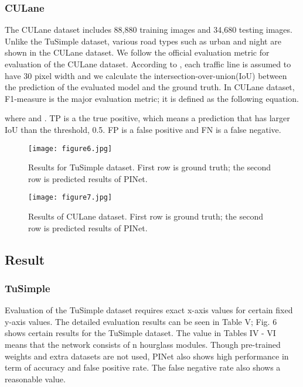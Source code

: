 \documentclass[journal]{IEEEtran}
\begin{document}
\subsubsection{CULane}
The CULane dataset includes 88,880 training images and 34,680 testing images. Unlike the TuSimple dataset, various road types such as urban and night are shown in the CULane dataset. We follow the official evaluation metric \cite{pan2018spatial} for evaluation of the CULane dataset. According to \cite{pan2018spatial}, each traffic line is assumed to have 30 pixel width and we calculate the intersection-over-union(IoU) between the prediction of the evaluated model and the ground truth. In CULane dataset, F1-measure is the major evaluation metric; it is defined as the following equation.



where  and . TP is a the true positive, which means a prediction that has larger IoU than the threshold, 0.5. FP is a false positive and FN is a false negative.







\begin{figure*}
    \centering
    \texttt{[image: figure6.jpg]}
    \caption{Results for TuSimple dataset. First row is ground truth; the second row is predicted results of PINet.}
\end{figure*}


\begin{figure*}
    \centering
    \texttt{[image: figure7.jpg]}
    \caption{Results of CULane dataset. First row is ground truth; the second row is predicted results of PINet.}
\end{figure*}

\subsection{Result}

\subsubsection{TuSimple}
Evaluation of the TuSimple dataset requires exact x-axis values for certain fixed y-axis values. The detailed evaluation results can be seen in Table V; Fig. 6 shows certain results for the TuSimple dataset. The value  in Tables IV - VI means that the network consists of n hourglass modules. Though pre-trained weights and extra datasets are not used, PINet also shows high performance in term of accuracy and false positive rate. The false negative rate also shows a reasonable value. 
\end{document}
